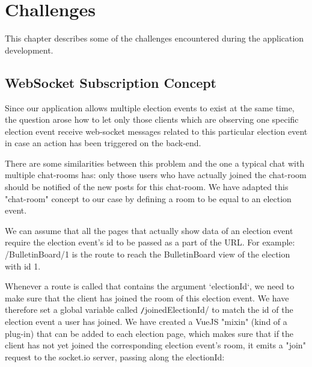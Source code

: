 \section{Challenges}
This chapter describes some of the challenges encountered during the application development.

\subsection{WebSocket Subscription Concept}
Since our application allows multiple election events to exist at the same time, the question arose how to let only those clients which are observing one specific election event receive web-socket messages related to this particular election event in case an action has been triggered on the back-end.

There are some similarities between this problem and the one a typical chat with multiple chat-rooms has: only those users who have actually joined the chat-room should be notified of the new posts for this chat-room. We have adapted this "{}chat-room"{} concept to our case by defining a room to be equal to an election event.

We can assume that all the pages that actually show data of an election event require the election event's id to be passed as a part of the URL. For example: /BulletinBoard/1 is the route to reach the BulletinBoard view of the election with id 1.

Whenever a route is called that contains the argument `electionId`, we need to make sure that the client has joined the room of this election event. We have therefore set a global variable called \texttt/joinedElectionId/ to match the id of the election event a user has joined. We have created a VueJS "{}mixin"{} (kind of a plug-in) that can be added to each election page, which makes sure that if the client has not yet joined the corresponding election event's room, it emits a "{}join"{} request to the socket.io server, passing along the electionId:

